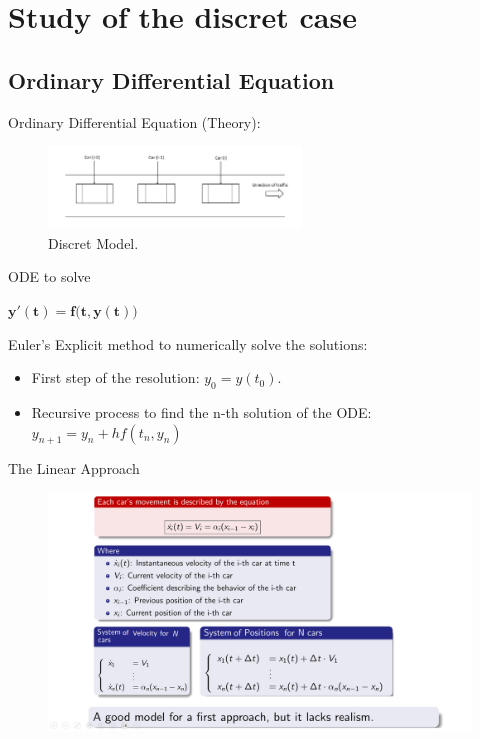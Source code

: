 \documentclass{beamer}
\begin{document}
\section{Study of the discret case}
\subsection{Ordinary Differential Equation}
\begin{frame}{Ordinary Differential Equation (Theory):}

\begin{figure}
    \centering
    \includegraphics[width=0.6\textwidth]{discret.png} 
    \caption{ Discret Model.}
\end{figure}
\vspace{-0.7cm}
\begin{block}{ODE to solve}
	\begin{center}
		$\boxed{\mathbf{y'(t) = f{\bigl (}t, y(t){\bigr )}}}$
	\end{center}
	Euler's Explicit method to numerically solve the solutions:
	\begin{itemize}
		\item First step of the resolution: $\boxed{y_0 = y(t_0)}$.
		\item Recursive process to find the n-th solution of the ODE: $\boxed{y_{n+1} = y_{n} + hf(t_{n}, y_{n})}$
	\end{itemize}
\end{block}


    
\end{frame}


\begin{frame}{The Linear Approach}
	\begin{figure}
		\includegraphics[width=1.0\textwidth]{test.png}
	\end{figure}
\end{frame}
\end{document}
